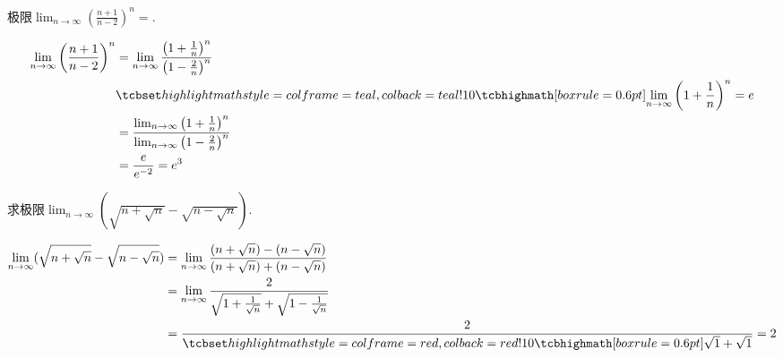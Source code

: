 \documentclass{ctexart}
\begin{document}
\mytoc
\begin{ques}[date=2020-8-20]
  极限$\lim_{n \to \infty} \left( \frac{n+1}{n-2} \right) ^n=$\blank.
\begin{solution}
  \begin{align*}
    \lim_{n \to \infty} \left( \frac{n+1}{n-2} \right) ^n
    &= \lim_{n \to \infty} \frac{\left( 1 + \frac{1}{n} \right) ^n}{\left( 1 -
    \frac{2}{n} \right) ^n}\\
    & \hint{\lim_{n \to \infty} \left( 1 + \frac{1}{n} \right) ^n = e}
    \\
    & = \frac{\lim_{n \to \infty} \left( 1 + \frac{1}{n} \right) ^n}{\lim_{n
    \to \infty} \left( 1 - \frac{2}{n} \right) ^n}\\
    & = \frac{e}{e^{-2}} = e^3
  \end{align*}
\end{solution}
\end{ques}

\begin{ques}[date=2020-8-20]
  求极限$\lim_{n \to \infty} (\sqrt{n + \sqrt{n}} - \sqrt{n - \sqrt{n}})$.
\begin{solution}
  \begin{align*}
    \lim_{n \to \infty} (\sqrt{n + \sqrt{n}} - \sqrt{n - \sqrt{n}})
    &= \lim_{n \to \infty} \frac{(n + \sqrt{n}) - (n - \sqrt{n})}{(n +
    \sqrt{n}) + (n - \sqrt{n})}\\
    &= \lim_{n \to \infty} \frac{2}{\sqrt{1 + \frac{1}{\sqrt{n}}} + \sqrt{1 -
    \frac{1}{\sqrt{n}}}}\\
    &= \frac{2}{\error{\sqrt{1} + \sqrt{1}}} = 2
  \end{align*}
\end{solution}
\end{ques}
\end{document}
